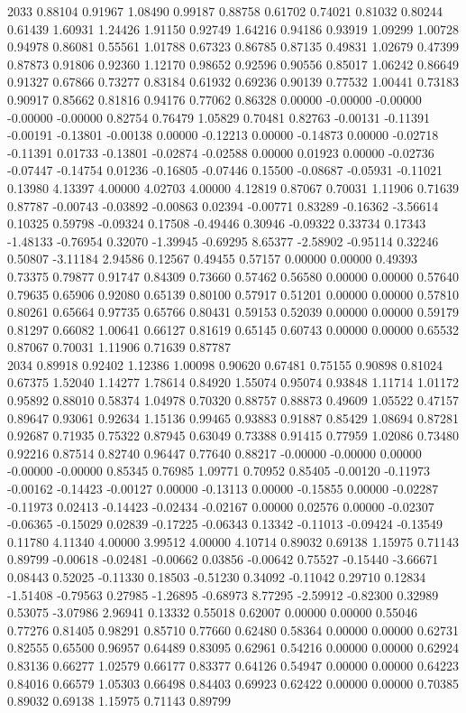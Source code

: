 {2033 0.88104 0.91967 1.08490 0.99187 0.88758 0.61702 0.74021 0.81032 0.80244 0.61439 1.60931 1.24426 1.91150 0.92749 1.64216 0.94186 0.93919 1.09299 1.00728 0.94978 0.86081 0.55561 1.01788 0.67323 0.86785 0.87135 0.49831 1.02679 0.47399 0.87873 0.91806 0.92360 1.12170 0.98652 0.92596 0.90556 0.85017 1.06242 0.86649 0.91327 0.67866 0.73277 0.83184 0.61932 0.69236 0.90139 0.77532 1.00441 0.73183 0.90917 0.85662 0.81816 0.94176 0.77062 0.86328 0.00000 -0.00000 -0.00000 -0.00000 -0.00000 0.82754 0.76479 1.05829 0.70481 0.82763 -0.00131 -0.11391 -0.00191 -0.13801 -0.00138 0.00000 -0.12213 0.00000 -0.14873 0.00000 -0.02718 -0.11391 0.01733 -0.13801 -0.02874 -0.02588 0.00000 0.01923 0.00000 -0.02736 -0.07447 -0.14754 0.01236 -0.16805 -0.07446 0.15500 -0.08687 -0.05931 -0.11021 0.13980 4.13397 4.00000 4.02703 4.00000 4.12819 0.87067 0.70031 1.11906 0.71639 0.87787 -0.00743 -0.03892 -0.00863 0.02394 -0.00771 0.83289 -0.16362 -3.56614 0.10325 0.59798 -0.09324 0.17508 -0.49446 0.30946 -0.09322 0.33734 0.17343 -1.48133 -0.76954 0.32070 -1.39945 -0.69295 8.65377 -2.58902 -0.95114 0.32246 0.50807 -3.11184 2.94586 0.12567 0.49455 0.57157 0.00000 0.00000 0.49393 0.73375 0.79877 0.91747 0.84309 0.73660 0.57462 0.56580 0.00000 0.00000 0.57640 0.79635 0.65906 0.92080 0.65139 0.80100 0.57917 0.51201 0.00000 0.00000 0.57810 0.80261 0.65664 0.97735 0.65766 0.80431 0.59153 0.52039 0.00000 0.00000 0.59179 0.81297 0.66082 1.00641 0.66127 0.81619 0.65145 0.60743 0.00000 0.00000 0.65532 0.87067 0.70031 1.11906 0.71639 0.87787 \\
2034 0.89918 0.92402 1.12386 1.00098 0.90620 0.67481 0.75155 0.90898 0.81024 0.67375 1.52040 1.14277 1.78614 0.84920 1.55074 0.95074 0.93848 1.11714 1.01172 0.95892 0.88010 0.58374 1.04978 0.70320 0.88757 0.88873 0.49609 1.05522 0.47157 0.89647 0.93061 0.92634 1.15136 0.99465 0.93883 0.91887 0.85429 1.08694 0.87281 0.92687 0.71935 0.75322 0.87945 0.63049 0.73388 0.91415 0.77959 1.02086 0.73480 0.92216 0.87514 0.82740 0.96447 0.77640 0.88217 -0.00000 -0.00000 0.00000 -0.00000 -0.00000 0.85345 0.76985 1.09771 0.70952 0.85405 -0.00120 -0.11973 -0.00162 -0.14423 -0.00127 0.00000 -0.13113 0.00000 -0.15855 0.00000 -0.02287 -0.11973 0.02413 -0.14423 -0.02434 -0.02167 0.00000 0.02576 0.00000 -0.02307 -0.06365 -0.15029 0.02839 -0.17225 -0.06343 0.13342 -0.11013 -0.09424 -0.13549 0.11780 4.11340 4.00000 3.99512 4.00000 4.10714 0.89032 0.69138 1.15975 0.71143 0.89799 -0.00618 -0.02481 -0.00662 0.03856 -0.00642 0.75527 -0.15440 -3.66671 0.08443 0.52025 -0.11330 0.18503 -0.51230 0.34092 -0.11042 0.29710 0.12834 -1.51408 -0.79563 0.27985 -1.26895 -0.68973 8.77295 -2.59912 -0.82300 0.32989 0.53075 -3.07986 2.96941 0.13332 0.55018 0.62007 0.00000 0.00000 0.55046 0.77276 0.81405 0.98291 0.85710 0.77660 0.62480 0.58364 0.00000 0.00000 0.62731 0.82555 0.65500 0.96957 0.64489 0.83095 0.62961 0.54216 0.00000 0.00000 0.62924 0.83136 0.66277 1.02579 0.66177 0.83377 0.64126 0.54947 0.00000 0.00000 0.64223 0.84016 0.66579 1.05303 0.66498 0.84403 0.69923 0.62422 0.00000 0.00000 0.70385 0.89032 0.69138 1.15975 0.71143 0.89799 \\
}
